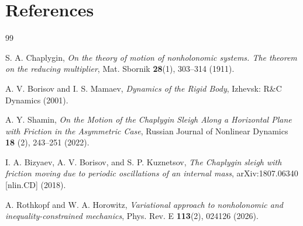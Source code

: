 \documentclass[11pt,aip,reprint,superscriptaddress]{revtex4-2}
\begin{document}
\section*{References}
\begin{thebibliography}{99}

S. A. Chaplygin,
\emph{On the theory of motion of nonholonomic systems. The theorem on the reducing multiplier},
Mat. Sbornik \textbf{28}(1), 303--314 (1911).

A. V. Borisov and I. S. Mamaev,
\emph{Dynamics of the Rigid Body},
Izhevsk: R\&C Dynamics (2001).

A. Y. Shamin,
\emph{On the Motion of the Chaplygin Sleigh Along a Horizontal Plane with Friction in the Asymmetric Case},
Russian Journal of Nonlinear Dynamics \textbf{18} (2), 243--251 (2022).

I. A. Bizyaev, A. V. Borisov, and S. P. Kuznetsov,
\emph{The Chaplygin sleigh with friction moving due to periodic oscillations of an internal mass},
arXiv:1807.06340 [nlin.CD] (2018).

A. Rothkopf and W. A. Horowitz,
\emph{Variational approach to nonholonomic and inequality-constrained mechanics},
Phys. Rev. E \textbf{113}(2), 024126 (2026).

\end{thebibliography}
\end{document}
